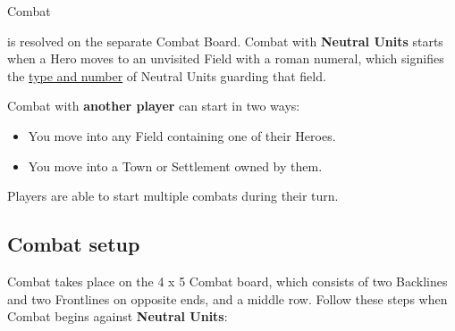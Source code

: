 
\begin{multicols*}{2}

\hypertarget{Combat}{Combat} is resolved on the separate Combat Board.
Combat with \textbf{Neutral Units} starts when a Hero moves to an unvisited Field with a roman numeral, which signifies the \hyperlink{Difficulty}{type and number} of Neutral Units guarding that field.

Combat with \textbf{another player} can start in two ways:
\begin{itemize}
  \item You move into any Field containing one of their Heroes.
  \item You move into a Town or Settlement owned by them.
\end{itemize}
Players are able to start multiple combats during their turn.

\subsection*{\hypertarget{Combatsetup}{Combat setup}}

Combat takes place on the 4 x 5 Combat board, which consists of two Backlines and two Frontlines on opposite ends, and a middle row.
Follow these steps when Combat begins against \textbf{Neutral Units}:


\end{multicols*}
